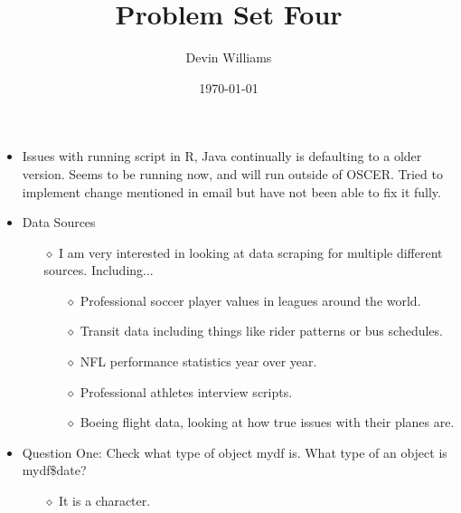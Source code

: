 \documentclass[12pt,letterpaper]{article}
\title{\textbf{Problem Set Four}}
\author{Devin Williams}
\date{\today}
\begin{document}
\maketitle

\begin{itemize}
     \item Issues with running script in R, Java continually is defaulting to a older version. Seems to be running now, and will run outside of OSCER. Tried to implement change mentioned in email but have not been able to fix it fully. 
    \item Data Sources
        \begin{itemize}
            \item[$\diamond$] I am very interested in looking at data scraping for multiple different sources. Including...
                \begin{itemize}
                    \item[$\diamond$] Professional soccer player values in leagues around the world. 
                \end{itemize}
                \begin{itemize}
                    \item[$\diamond$] Transit data including things like rider patterns or bus schedules.
                \end{itemize}
                 \begin{itemize}
                    \item[$\diamond$] NFL performance statistics year over year. 
                \end{itemize}
                \begin{itemize}
                    \item[$\diamond$] Professional athletes interview scripts. 
                \end{itemize}
                \begin{itemize}
                    \item[$\diamond$] Boeing flight data, looking at how true issues with their planes are. 
                \end{itemize}
        \end{itemize}
    \item Question One: Check what type of object mydf is. What type of an object is mydf\$date?
       \begin{itemize}
            \item[$\diamond$] It is a character. 
        \end{itemize}

\end{itemize}
\end{document}
